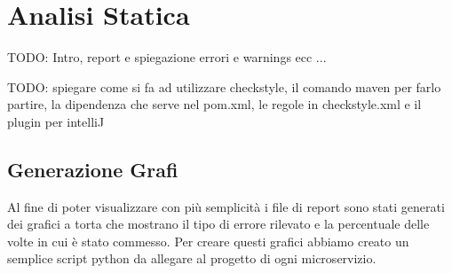 \section{Analisi Statica}

TODO: Intro, report e spiegazione errori e warnings ecc ...

TODO: spiegare come si fa ad utilizzare checkstyle, il comando maven per farlo partire, la dipendenza che serve nel pom.xml, le regole in checkstyle.xml e il plugin per intelliJ 

\subsection{Generazione Grafi}
Al fine di poter visualizzare con più semplicità i file di report sono stati generati dei grafici a torta che mostrano il tipo di errore rilevato e la percentuale delle volte in cui è stato commesso.
Per creare questi grafici abbiamo creato un semplice script python da allegare al progetto di ogni microservizio. 
